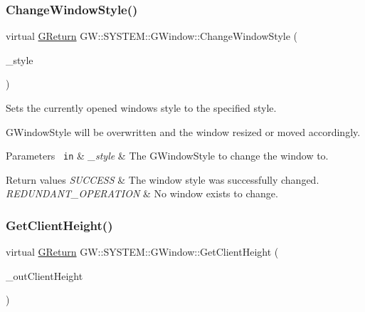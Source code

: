 \subsubsection{\texorpdfstring{ChangeWindowStyle()}{ChangeWindowStyle()}}
{\footnotesize\ttfamily virtual \mbox{\hyperlink{namespaceGW_a67a839e3df7ea8a5c5686613a7a3de21}{G\+Return}} G\+W\+::\+S\+Y\+S\+T\+E\+M\+::\+G\+Window\+::\+Change\+Window\+Style (\begin{DoxyParamCaption}\item[{\mbox{\hyperlink{namespaceGW_1_1SYSTEM_ad117891e556631f842625c348d36a071}{G\+Window\+Style}}}]{\+\_\+style }\end{DoxyParamCaption})\hspace{0.3cm}{\ttfamily [pure virtual]}}



Sets the currently opened window\textquotesingle{}s style to the specified style. 

G\+Window\+Style will be overwritten and the window resized or moved accordingly.


\begin{DoxyParams}[1]{Parameters}
\mbox{\texttt{ in}}  & {\em \+\_\+style} & The G\+Window\+Style to change the window to.\\
\hline
\end{DoxyParams}

\begin{DoxyRetVals}{Return values}
{\em S\+U\+C\+C\+E\+SS} & The window style was successfully changed. \\
\hline
{\em R\+E\+D\+U\+N\+D\+A\+N\+T\+\_\+\+O\+P\+E\+R\+A\+T\+I\+ON} & No window exists to change. \\
\hline
\end{DoxyRetVals}
\mbox{\label{classGW_1_1SYSTEM_1_1GWindow_aca175a29d6e87e4d4ed848325216c8f1}} 
\subsubsection{\texorpdfstring{GetClientHeight()}{GetClientHeight()}}
{\footnotesize\ttfamily virtual \mbox{\hyperlink{namespaceGW_a67a839e3df7ea8a5c5686613a7a3de21}{G\+Return}} G\+W\+::\+S\+Y\+S\+T\+E\+M\+::\+G\+Window\+::\+Get\+Client\+Height (\begin{DoxyParamCaption}\item[{unsigned int \&}]{\+\_\+out\+Client\+Height }\end{DoxyParamCaption})\hspace{0.3cm}{\ttfamily [pure virtual]}}



